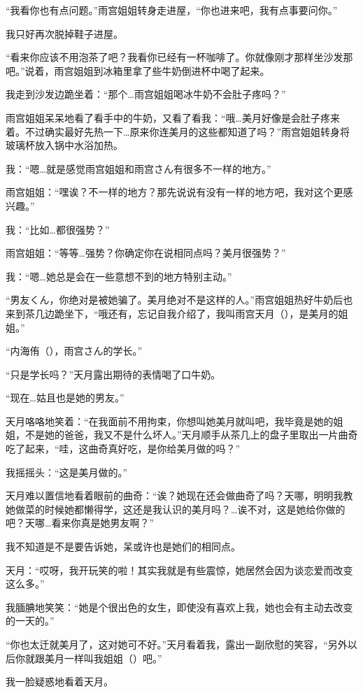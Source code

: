 “我看你也有点问题。”雨宫姐姐转身走进屋，“你也进来吧，我有点事要问你。”

我只好再次脱掉鞋子进屋。

“看来你应该不用泡茶了吧？我看你已经有一杯咖啡了。你就像刚才那样坐沙发那吧。”说着，雨宫姐姐到冰箱里拿了些牛奶倒进杯中喝了起来。

我走到沙发边跪坐着：“那个…雨宫姐姐喝冰牛奶不会肚子疼吗？”

雨宫姐姐呆呆地看了看手中的牛奶，又看了看我：“哦…美月好像是会肚子疼来着。不过确实最好先热一下…原来你连美月的这些都知道了吗？”雨宫姐姐转身将玻璃杯放入锅中水浴加热。

我：“嗯…就是感觉雨宫姐姐和雨宫さん有很多不一样的地方。”

雨宫姐姐：“嘿诶？不一样的地方？那先说说有没有一样的地方吧，我对这个更感兴趣。”

我：“比如…都很强势？”

雨宫姐姐：“等等…强势？你确定你在说相同点吗？美月很强势？”

我：“嗯…她总是会在一些意想不到的地方特别主动。”

“男友くん，你绝对是被她骗了。美月绝对不是这样的人。”雨宫姐姐热好牛奶后也来到茶几边跪坐下，“哦还有，忘记自我介绍了，我叫雨宫天月（），是美月的姐姐。”

“内海侑（），雨宫さん的学长。”

“只是学长吗？”天月露出期待的表情喝了口牛奶。

“现在…姑且也是她的男友。”

天月咯咯地笑着：“在我面前不用拘束，你想叫她美月就叫吧，我毕竟是她的姐姐，不是她的爸爸，我又不是什么坏人。”天月顺手从茶几上的盘子里取出一片曲奇吃了起来，“哇，这曲奇真好吃，是你给美月做的吗？”

我摇摇头：“这是美月做的。”

天月难以置信地看着眼前的曲奇：“诶？她现在还会做曲奇了吗？天哪，明明我教她做菜的时候她都懒得学，这还是我认识的美月吗？…诶不对，这是她给你做的吧？天哪…看来你真是她男友啊？”

我不知道是不是要告诉她，呆或许也是她们的相同点。

天月：“哎呀，我开玩笑的啦！其实我就是有些震惊，她居然会因为谈恋爱而改变这么多。”

我腼腆地笑笑：“她是个很出色的女生，即使没有喜欢上我，她也会有主动去改变的一天的。”

“你也太迁就美月了，这对她可不好。”天月看着我，露出一副欣慰的笑容，“另外以后你就跟美月一样叫我姐姐（）吧。”

我一脸疑惑地看着天月。


